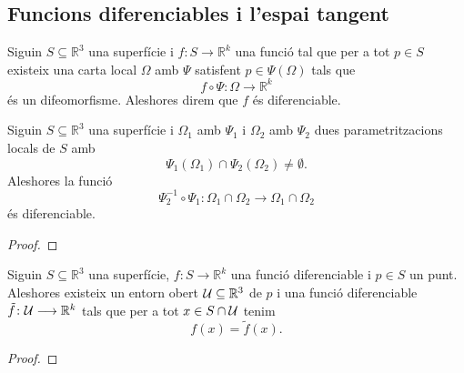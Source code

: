 \documentclass[../../Main.tex]{subfiles}
\begin{document}
	\subsection{Funcions diferenciables i l'espai tangent}
	\begin{definition}
		\label{def:funció diferenciable}
		Siguin \(S\subseteq\mathbb{R}^{3}\) una superfície i \(f\colon S\longrightarrow\mathbb{R}^{k}\) una funció tal que per a tot \(p\in S\) existeix una carta local \(\Omega\) amb \(\Psi\) satisfent \(p\in\Psi(\Omega)\) tals que
		\[f\circ\Psi\colon\Omega\longrightarrow\mathbb{R}^{k}\]
		és un difeomorfisme. Aleshores direm que \(f\) és diferenciable.
	\end{definition}
	\begin{theorem}
		\label{thm:la composició de parametritzacions locals és una funció diferenciable}
		Siguin \(S\subseteq\mathbb{R}^{3}\) una superfície i \(\Omega_{1}\) amb \(\Psi_{1}\) i \(\Omega_{2}\) amb \(\Psi_{2}\) dues parametritzacions locals de \(S\) amb
		\[\Psi_{1}(\Omega_{1})\cap\Psi_{2}(\Omega_{2})\neq\emptyset.\]
		Aleshores la funció
		\[\Psi_{2}^{-1}\circ\Psi_{1}\colon\Omega_{1}\cap\Omega_{2}\longrightarrow\Omega_{1}\cap\Omega_{2}\]
		és diferenciable.
		\begin{proof}
%			
		\end{proof}
	\end{theorem}
	\begin{proposition}
		\label{prop:per a tot punt i funció diferenciable d'una superfície podem trobar una segona funció diferenciable igual en un entorn del punt}
		Siguin \(S\subseteq\mathbb{R}^{3}\) una superfície, \(f\colon S\longrightarrow\mathbb{R}^{k}\) una funció diferenciable i \(p\in S\) un punt. Aleshores  existeix un entorn obert \(\mathcal{U}\subseteq\mathbb{R}^{3}\) de \(p\) i una funció diferenciable \(\tilde{f}\colon\mathcal{U}\longrightarrow\mathbb{R}^{k}\) tals que per a tot \(x\in S\cap\mathcal{U}\) tenim
		\[f(x)=\tilde{f}(x).\]
		\begin{proof}
		\end{proof}
	\end{proposition}
\end{document}
